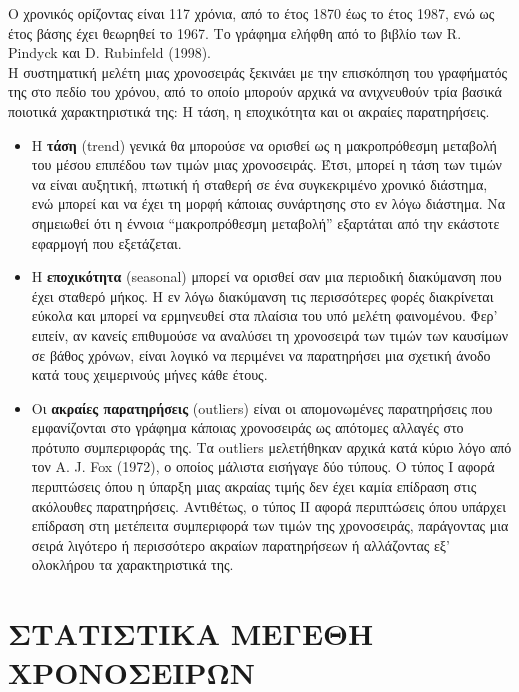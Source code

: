 Ο χρονικός ορίζοντας είναι 117 χρόνια, από το έτος 1870 έως το έτος 1987, ενώ ως έτος
βάσης έχει θεωρηθεί το 1967. Το γράφημα ελήφθη από το βιβλίο των R. Pindyck και
D. Rubinfeld (1998).\\

Η συστηματική μελέτη μιας χρονοσειράς ξεκινάει με την επισκόπηση του
γραφήματός της στο πεδίο του χρόνου, από το οποίο μπορούν αρχικά να ανιχνευθούν
τρία βασικά ποιοτικά χαρακτηριστικά της: Η τάση, η εποχικότητα και οι ακραίες
παρατηρήσεις.\\
\begin{itemize}

\item Η \textbf{τάση} (trend) γενικά θα μπορούσε να ορισθεί ως η μακροπρόθεσμη μεταβολή του
μέσου επιπέδου των τιμών μιας χρονοσειράς. Έτσι, μπορεί η τάση των τιμών να είναι
αυξητική, πτωτική ή σταθερή σε ένα συγκεκριμένο χρονικό διάστημα, ενώ μπορεί και να
έχει τη μορφή κάποιας συνάρτησης στο εν λόγω διάστημα. Να σημειωθεί ότι η έννοια
“μακροπρόθεσμη μεταβολή” εξαρτάται από την εκάστοτε εφαρμογή που εξετάζεται.
\item Η \textbf{εποχικότητα} (seasonal) μπορεί να ορισθεί σαν μια περιοδική διακύμανση που έχει
σταθερό μήκος. Η εν λόγω διακύμανση τις περισσότερες φορές διακρίνεται εύκολα και
μπορεί να ερμηνευθεί στα πλαίσια του υπό μελέτη φαινομένου. Φερ' ειπείν, αν
κανείς επιθυμούσε να αναλύσει τη χρονοσειρά των τιμών των καυσίμων σε βάθος
χρόνων, είναι λογικό να περιμένει να παρατηρήσει μια σχετική άνοδο κατά τους
χειμερινούς μήνες κάθε έτους.

\item Οι \textbf{ακραίες παρατηρήσεις} (outliers) είναι οι απομονωμένες παρατηρήσεις που
εμφανίζονται στο γράφημα κάποιας χρονοσειράς ως απότομες αλλαγές στο πρότυπο
συμπεριφοράς της. Τα outliers μελετήθηκαν αρχικά κατά κύριο λόγο από τον A. J. Fox
(1972), ο οποίος μάλιστα εισήγαγε δύο τύπους. Ο τύπος I αφορά περιπτώσεις όπου η
ύπαρξη μιας ακραίας τιμής δεν έχει καμία επίδραση στις ακόλουθες παρατηρήσεις.
Αντιθέτως, ο τύπος ΙΙ αφορά περιπτώσεις όπου υπάρχει επίδραση στη μετέπειτα
συμπεριφορά των τιμών της χρονοσειράς, παράγοντας μια σειρά λιγότερο ή περισσότερο
ακραίων παρατηρήσεων ή αλλάζοντας εξ’ ολοκλήρου τα χαρακτηριστικά της.
\end{itemize}

\section{ΣΤΑΤΙΣΤΙΚΑ ΜΕΓΕΘΗ ΧΡΟΝΟΣΕΙΡΩΝ}
